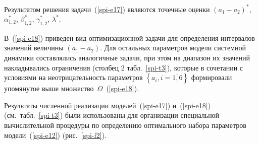 {\begin{multicols}{2}
  Результатом решения задачи~(\ref{spi-e17}) являются точечные оценки
$\left( a_1 - a_2 \right)^*$, $\alpha_{1,2}^*$, $\beta_{1,2}^*$, $\gamma_{1,2}^*$,
$\lambda^*$.

  В~(\ref{spi-e18}) приведен вид оптимизационной задачи для определения интервалов
значений величины $\left( a_1 - a_2\right)$. Для остальных параметров модели
сис\-тем\-ной динамики составлялись аналогичные задачи, при этом на диапазон
их значений накладывались ограничения (столбец 2 табл.~\ref{spi-t3}), которые
в сочетании с условиями на неотрицательность параметров $\left\{ a_i, i =
\overline{1, 6}\right\}$ формировали упомянутое выше
множество~$\Omega$~(\ref{spi-e18}).


  Результаты численной реализации моделей~(\ref{spi-e17}) и~(\ref{spi-e18})
(см.\ табл.~\ref{spi-t3}) были использованы для организации специальной
вычислительной процедуры по определению оптимального набора параметров
модели~(\ref{spi-e12}) (рис.~\ref{spi-f2}).

\begin{table*}\small %
\begin{center}
\vspace*{2ex}


\end{center}
\end{table*}
\end{multicols}}
